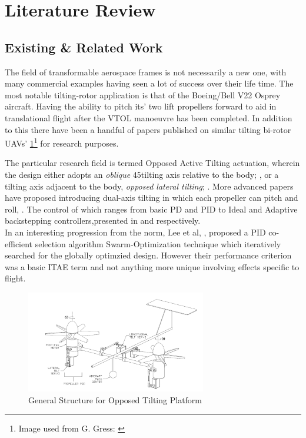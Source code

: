 \section{Literature Review}
\label{sec:intro.litreview}
\subsection{Existing \& Related Work}
\label{subsec:intro.lit.related}
The field of transformable aerospace frames is not necessarily a new one, with many commercial examples having seen a lot of success over their life time. The most notable tilting-rotor application is that of the Boeing/Bell V22 Osprey aircraft. Having the ability to pitch its' two lift propellers forward to aid in translational flight after the VTOL manoeuvre has been completed. In addition to this there have been a handful of papers published on similar tilting bi-rotor UAVs' \ref{fig:dualaxistilt}\footnote{Image used from G. Gress: \cite{gres2007}} for research purposes.
\par
The particular research field is termed Opposed Active 
Tilting actuation, wherein the design either adopts an \emph{oblique} 45\textdegree tilting axis relative to the body; \cite{obliquepitch,tiltrotorcontrol,passiveobliquetilting}, or a tilting axis adjacent to the body, \emph{opposed lateral tilting}; \cite{smalltwotilting,tiltrotorUAV}. More advanced papers have proposed introducing dual-axis tilting in which each propeller can pitch and roll, \cite{gres2007,opposedlateraldualaxis}. The control of which ranges from basic PD \cite{obliquepitch} and PID \cite{tiltrotorUAV} to Ideal and Adaptive backstepping controllers,presented in \cite{smalltwotilting} and \cite{adaptivebackstep} respectively.
\\
In an interesting progression from the norm, Lee et al,  \cite{autopilotPSO}, proposed a PID co-efficient selection algorithm Swarm-Optimization technique which iteratively searched for the globally optimzied design. However their performance criterion was a basic ITAE term and not anything more unique involving effects specific to flight. 
\\
\begin{figure}[htbp]
\centering
\includegraphics[width=0.7\textwidth]{figs/dualaxistilt}
\caption{General Structure for Opposed Tilting Platform}
\label{fig:dualaxistilt}
\end{figure}
